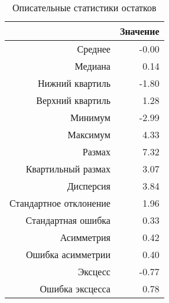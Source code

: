 \begin{table}[ht]
\centering
\begin{tabular}{rr}
  \hline
 & Значение \\ 
  \hline
Среднее & -0.00 \\ 
  Медиана & 0.14 \\ 
  Нижний квартиль & -1.80 \\ 
  Верхний квартиль & 1.28 \\ 
  Минимум & -2.99 \\ 
  Максимум & 4.33 \\ 
  Размах & 7.32 \\ 
  Квартильный размах & 3.07 \\ 
  Дисперсия & 3.84 \\ 
  Стандартное отклонение & 1.96 \\ 
  Стандартная ошибка & 0.33 \\ 
  Асимметрия & 0.42 \\ 
  Ошибка асимметрии & 0.40 \\ 
  Эксцесс & -0.77 \\ 
  Ошибка эксцесса & 0.78 \\ 
   \hline
\end{tabular}
\caption{Описательные статистики остатков} 
\label{table:residuals_dstats}
\end{table}
